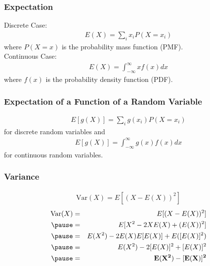 \documentclass[handout]{beamer}
\begin{document}
\begin{frame}
\frametitle{Expectation}
\pause
Discrete Case:
\pause
\begin{eqnarray*}
E(X) = \sum_i x_i P(X = x_i)
\end{eqnarray*}
where $P(X = x)$ is the probability mass function (PMF).\\
\pause
\bigskip
Continuous Case:
\pause
\begin{eqnarray*}
E(X) = \int^{\infty}_{-\infty} x f(x) dx
\end{eqnarray*}
where $f(x)$ is the probability density function (PDF).
\end{frame}

\begin{frame}
\frametitle{Expectation of a Function of a Random Variable}
\pause
\begin{eqnarray*}
E[g(X)] = \sum_i g(x_i) P(X = x_i)
\end{eqnarray*}
for discrete random variables \pause and 
\begin{eqnarray*}
E[g(X)] = \int_{-\infty}^{\infty} g(x) f(x) dx
\end{eqnarray*}
for continuous random variables.  \\
\bigskip
\pause
\end{frame}

\begin{frame}
\frametitle{Variance}
\pause
\begin{eqnarray*}
\mathrm{Var}(X) = E[(X - E(X))^2]
\end{eqnarray*}
\pause
\begin{eqnarray*}
\mathrm{Var}(X) &=& E[(X - E(X))^2]\\
\pause
&=& E[X^2 - 2 X E(X) + (E(X))^2]\\
\pause
&=& E(X^2) - 2 E(X) E[E(X)] + E([E(X)]^2)\\
\pause
&=& E(X^2) - 2 [E(X)]^2 + [E(X)]^2\\
\pause
&=& \mathbf{E(X^2) - [E(X)]^2}
\end{eqnarray*}
\pause
\end{frame}
\end{document}
